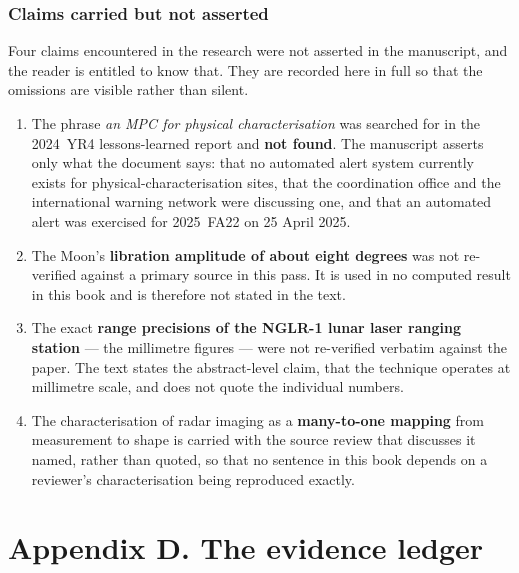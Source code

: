 \subsection*{Claims carried but not asserted}

Four claims encountered in the research were not asserted in the manuscript,
and the reader is entitled to know that. They are recorded here in full so
that the omissions are visible rather than silent.

\begin{enumerate}[leftmargin=2.25em,itemsep=3pt]
\item The phrase \emph{an MPC for physical characterisation} was searched for
in the 2024~YR4 lessons-learned report and \textbf{not found}. The
manuscript asserts only what the document says: that no automated alert
system currently exists for physical-characterisation sites, that the
coordination office and the international warning network were discussing
one, and that an automated alert was exercised for 2025~FA22 on 25 April
2025.

\item The Moon's \textbf{libration amplitude of about eight degrees} was not
re-verified against a primary source in this pass. It is used in no
computed result in this book and is therefore not stated in the text.

\item The exact \textbf{range precisions of the NGLR-1 lunar laser ranging
station} --- the millimetre figures --- were not re-verified verbatim
against the paper. The text states the abstract-level claim, that the
technique operates at millimetre scale, and does not quote the individual
numbers.

\item The characterisation of radar imaging as a \textbf{many-to-one mapping}
from measurement to shape is carried with the source review that discusses
it named, rather than quoted, so that no sentence in this book depends on a
reviewer's characterisation being reproduced exactly.
\end{enumerate}
\clearpage

\chapter*{Appendix D. The evidence ledger}
\thispagestyle{plain}

